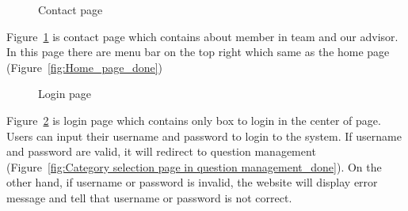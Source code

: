 \documentclass[12pt,oneside,openright,a4paper]{cpe-english-project}
\begin{document}
		\begin{figure}[!h]\centering
			\caption{Contact page}\label{fig:Contact_page_done}
		\end{figure}
		\begin{flushleft}
			Figure~\ref*{fig:Contact_page_done} is contact page which contains about member in team and our advisor. In this page there are menu bar on the top right which same as the home page (Figure~\ref*{fig:Home_page_done})
		\end{flushleft}

		\begin{figure}[!h]\centering
			\caption{Login page}\label{fig:Login_page_done}
		\end{figure}
		\begin{flushleft}
			Figure~\ref*{fig:Login_page_done} is login page which contains only box to login in the center of page. Users can input their username and password to login to the system. If username and password are valid, it will redirect to question management (Figure~\ref*{fig:Category selection page in question management_done}). On the other hand, if username or password is invalid, the website will display error message and tell that username or password is not correct.
		\end{flushleft}
\end{document}
